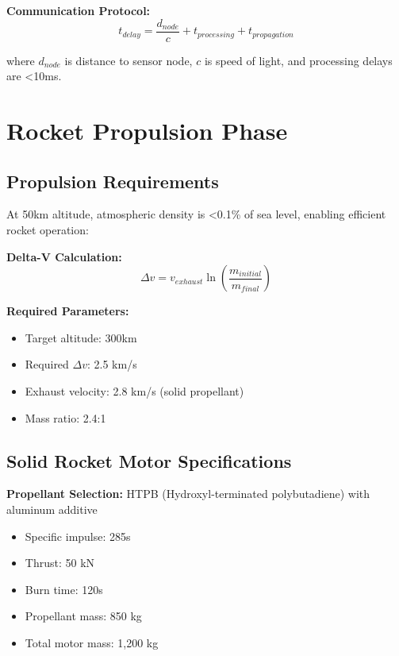 \documentclass[11pt,a4paper]{article}
\begin{document}
\textbf{Communication Protocol:}
\begin{equation}
t_{delay} = \frac{d_{node}}{c} + t_{processing} + t_{propagation}
\end{equation}

where $d_{node}$ is distance to sensor node, $c$ is speed of light, and processing delays are <10ms.

\section{Rocket Propulsion Phase}

\subsection{Propulsion Requirements}

At 50km altitude, atmospheric density is <0.1\% of sea level, enabling efficient rocket operation:

\textbf{Delta-V Calculation:}
\begin{equation}
\Delta v = v_{exhaust} \ln\left(\frac{m_{initial}}{m_{final}}\right)
\end{equation}

\textbf{Required Parameters:}
\begin{itemize}
    \item Target altitude: 300km
    \item Required $\Delta v$: 2.5 km/s
    \item Exhaust velocity: 2.8 km/s (solid propellant)
    \item Mass ratio: 2.4:1
\end{itemize}

\subsection{Solid Rocket Motor Specifications}

\textbf{Propellant Selection:} HTPB (Hydroxyl-terminated polybutadiene) with aluminum additive
\begin{itemize}
    \item Specific impulse: 285s
    \item Thrust: 50 kN
    \item Burn time: 120s
    \item Propellant mass: 850 kg
    \item Total motor mass: 1,200 kg
\end{itemize}
\end{document}
